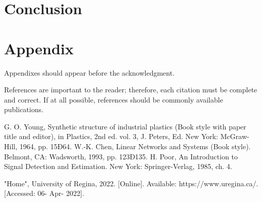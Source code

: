 \documentclass[letterpaper, 10 pt, conference]{ieeeconf}
\begin{document}
\section{Conclusion}


\addtolength{\textheight}{-12cm}








\section*{Appendix}

Appendixes should appear before the acknowledgment.



References are important to the reader; therefore, each citation must be complete and correct. If at all possible, references should be commonly available publications.



\begin{thebibliography}{99}

 G. O. Young, Synthetic structure of industrial plastics (Book style with paper title and editor), 	in Plastics, 2nd ed. vol. 3, J. Peters, Ed.  New York: McGraw-Hill, 1964, pp. 15Ð64.
 W.-K. Chen, Linear Networks and Systems (Book style).	Belmont, CA: Wadsworth, 1993, pp. 123Ð135.
 H. Poor, An Introduction to Signal Detection and Estimation.   New York: Springer-Verlag, 1985, ch. 4.

 "Home", University of Regina, 2022. [Online]. Available: https://www.uregina.ca/. [Accessed: 06- Apr- 2022].

\end{thebibliography}
\end{document}
